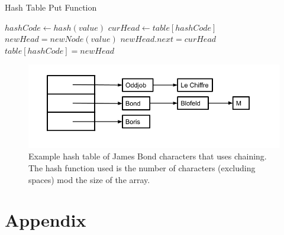 \documentclass[letterpaper, 10pt,DIV=13]{scrartcl}
\numberwithin{equation}{section} %
\numberwithin{figure}{section} %
\numberwithin{table}{section} %
\begin{document}
\begin{algorithm}
  \caption{Hash Table Put Function}
  \label{algorithm:hashPut}
  \begin{algorithmic}[1]
        \State $hashCode \gets hash(value)$ 
        \State $curHead \gets table[hashCode]$ 
        \State $newHead = new Node(value)$ 
          \State $newHead.next = curHead$ 
        \EndIf
        \State $table[hashCode] = newHead$ 
      \EndProcedure
  \end{algorithmic}
\end{algorithm}

\begin{figure}[ht] 
  \centering 
  \includegraphics[width=15cm]{hashing}
  \caption{Example hash table of James Bond characters that uses chaining. The hash function used is the number of characters (excluding spaces) mod the size of the array.}
  \label{figure:hashing}
\end{figure}

\section{Appendix}
\end{document}
